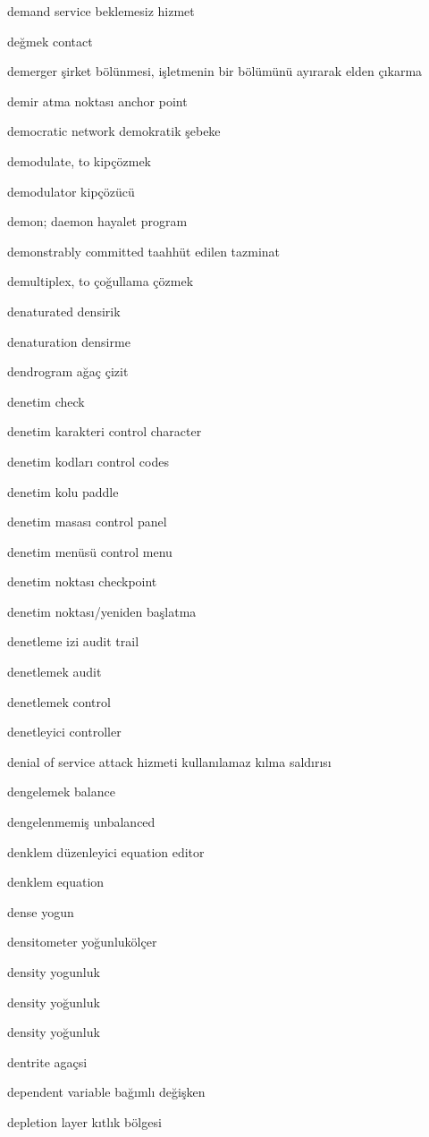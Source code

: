 \documentclass[12pt,fleqn]{article}\usepackage{../../common}
\begin{document}
demand service beklemesiz hizmet

değmek contact

demerger şirket bölünmesi, işletmenin bir bölümünü ayırarak elden çıkarma

demir atma noktası anchor point

democratic network demokratik şebeke

demodulate, to kipçözmek

demodulator kipçözücü

demon; daemon hayalet program

demonstrably committed taahhüt edilen tazminat

demultiplex, to çoğullama çözmek

denaturated densirik

denaturation densirme

dendrogram ağaç çizit

denetim check

denetim karakteri control character

denetim kodları control codes

denetim kolu paddle

denetim masası control panel

denetim menüsü control menu

denetim noktası checkpoint

denetim noktası/yeniden başlatma

denetleme izi audit trail

denetlemek audit

denetlemek control

denetleyici controller

denial of service attack hizmeti kullanılamaz kılma saldırısı

dengelemek balance

dengelenmemiş unbalanced

denklem düzenleyici equation editor

denklem equation

dense yogun

densitometer yoğunlukölçer

density yogunluk

density yoğunluk

density yoğunluk

dentrite agaçsi

dependent variable bağımlı değişken

depletion layer kıtlık bölgesi
\end{document}
